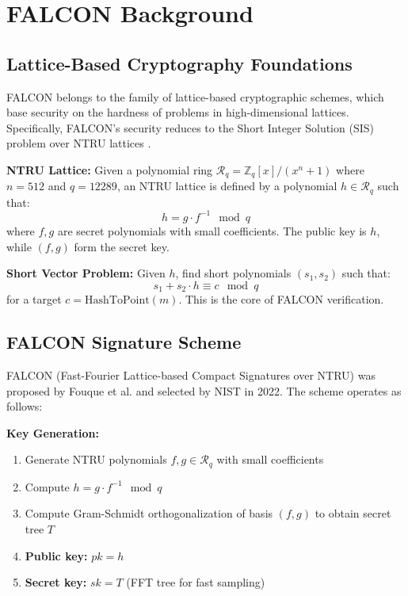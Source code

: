 \section{FALCON Background}


\subsection{Lattice-Based Cryptography Foundations}

FALCON belongs to the family of lattice-based cryptographic schemes, which base security on the hardness of problems in high-dimensional lattices. Specifically, FALCON's security reduces to the Short Integer Solution (SIS) problem over NTRU lattices \cite{prest2017sharper}.

\textbf{NTRU Lattice:} Given a polynomial ring $\mathcal{R}_q = \mathbb{Z}_q[x]/(x^n + 1)$ where $n = 512$ and $q = 12289$, an NTRU lattice is defined by a polynomial $h \in \mathcal{R}_q$ such that:
\begin{equation}
h = g \cdot f^{-1} \mod q
\end{equation}
where $f, g$ are secret polynomials with small coefficients. The public key is $h$, while $(f, g)$ form the secret key.

\textbf{Short Vector Problem:} Given $h$, find short polynomials $(s_1, s_2)$ such that:
\begin{equation}
s_1 + s_2 \cdot h \equiv c \mod q
\end{equation}
for a target $c = \text{HashToPoint}(m)$. This is the core of FALCON verification.

\subsection{FALCON Signature Scheme}

FALCON (Fast-Fourier Lattice-based Compact Signatures over NTRU) was proposed by Fouque et al. \cite{falcon2020} and selected by NIST in 2022. The scheme operates as follows:

\textbf{Key Generation:}
\begin{enumerate}
    \item Generate NTRU polynomials $f, g \in \mathcal{R}_q$ with small coefficients
    \item Compute $h = g \cdot f^{-1} \mod q$
    \item Compute Gram-Schmidt orthogonalization of basis $(f, g)$ to obtain secret tree $T$
    \item \textbf{Public key:} $pk = h$
    \item \textbf{Secret key:} $sk = T$ (FFT tree for fast sampling)
\end{enumerate}

